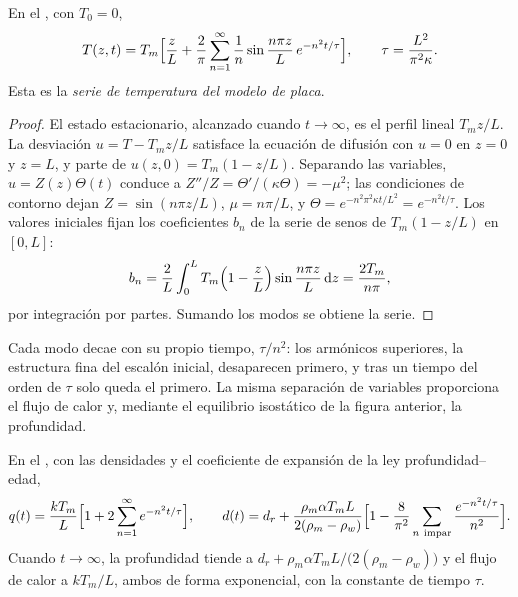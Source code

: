 \begin{theorem}\label{thm:b3:lithosphere-thermal-models:plate-series}
En el , con $T_0 = 0$,
\[
  T(z, t) = T_m\Bigl[\frac zL + \frac2\pi\sum_{n=1}^\infty\frac1n
  \sin\frac{n\pi z}{L}\,e^{-n^2t/\tau}\Bigr],\qquad
  \tau = \frac{L^2}{\pi^2\kappa} .
\]
Esta es la \emph{serie de temperatura del modelo de placa}.
\end{theorem}

\begin{proof}
El estado estacionario, alcanzado cuando $t \to \infty$, es el perfil lineal $T_mz/L$.
La desviación $u = T - T_mz/L$ satisface la ecuación de difusión con $u = 0$ en
$z = 0$ y $z = L$, y parte de $u(z, 0) = T_m(1 - z/L)$. Separando las
variables, $u = Z(z)\Theta(t)$ conduce a $Z''/Z = \Theta'/(\kappa\Theta) = -\mu^2$;
las condiciones de contorno dejan $Z = \sin(n\pi z/L)$, $\mu = n\pi/L$, y
$\Theta = e^{-n^2\pi^2\kappa t/L^2} = e^{-n^2t/\tau}$. Los valores iniciales fijan los
coeficientes $b_n$ de la serie de senos de $T_m(1 - z/L)$ en $[0, L]$:
\[
  b_n = \frac2L\int_0^LT_m\Bigl(1 - \frac zL\Bigr)\sin\frac{n\pi z}{L}\,\mathrm dz
  = \frac{2T_m}{n\pi},
\]
por integración por partes. Sumando los modos se obtiene la serie.
\end{proof}

Cada modo decae con su propio tiempo, $\tau/n^2$: los armónicos superiores, la
estructura fina del escalón inicial, desaparecen primero, y tras un tiempo del orden de $\tau$
solo queda el primero. La misma separación de variables proporciona el flujo de calor
y, mediante el equilibrio isostático de la figura anterior, la profundidad.

\begin{proposition}\label{prop:b3:lithosphere-thermal-models:plate-depth}
En el , con las densidades y el coeficiente de expansión de la
ley profundidad--edad,
\[
  q(t) = \frac{kT_m}{L}\Bigl[1 + 2\sum_{n=1}^\infty e^{-n^2t/\tau}\Bigr],\qquad
  d(t) = d_r + \frac{\rho_m\alpha T_mL}{2(\rho_m - \rho_w)}
  \Bigl[1 - \frac{8}{\pi^2}\sum_{n\ \text{impar}}\frac{e^{-n^2t/\tau}}{n^2}\Bigr].
\]
Cuando $t \to \infty$, la profundidad tiende a $d_r + \rho_m\alpha T_mL/\bigl(2(\rho_m -
\rho_w)\bigr)$ y el flujo de calor a $kT_m/L$, ambos de forma exponencial, con la
constante de tiempo $\tau$.
\end{proposition}

